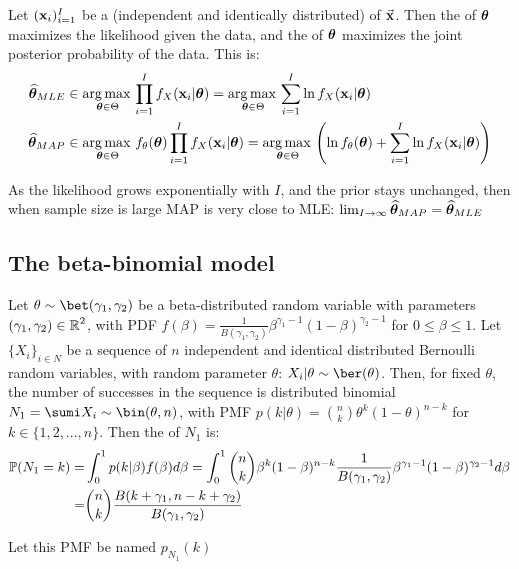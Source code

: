 Let $(\vb{x}_i)_{i=1}^I$ be a  (independent and identically distributed) of $\va{x}$. Then the  of $\vb*{\theta}$ maximizes the likelihood given the data, and the  of $\vb*{\theta}$ maximizes the joint posterior probability of the data. This is:
\begin{align*}
    \widehat{\vb*{\theta}}_{MLE} &\in\operatorname*{arg\,max\,}\limits_{\vb*{\theta}\in\Theta}\prod_{i=1}^I f_{X}(\vb{x}_i|\vb*{\theta}) = \operatorname*{arg\,max\,}\limits_{\vb*{\theta}\in\Theta}\sum_{i=1}^I\ln f_{X}(\vb{x}_i|\vb*{\theta})\\
    \widehat{\vb*{\theta}}_{MAP} &\in\operatorname*{arg\,max\,}\limits_{\vb*{\theta}\in\Theta}f_\theta(\vb*{\theta})
    \prod_{i=1}^I f_{X}(\vb{x}_i|\vb*{\theta}) = \operatorname*{arg\,max\,}\limits_{\vb*{\theta}\in\Theta}\left(\ln f_\theta(\vb*{\theta})+\sum_{i=1}^I\ln f_{X}(\vb{x}_i|\vb*{\theta})\right)
\end{align*}

As the likelihood grows exponentially with $I$, and the prior stays unchanged, then when sample size is large MAP is very close to MLE: $\lim_{I\rightarrow\infty}\widehat{\vb*{\theta}}_{MAP}=\widehat{\vb*{\theta}}_{MLE}$ \medskip























\subsection{The beta-binomial model}
Let  $\theta\sim\bet(\gamma_1,\gamma_2)$ be a beta-distributed random variable with parameters $(\gamma_1,\gamma_2)\in\operatorname{\mathbb{R}}^2$, with PDF $f(\beta)=\frac{1}{B(\gamma_1,\gamma_2)}\beta^{\gamma_1-1}(1-\beta)^{\gamma_2-1}$ for $0\leq\beta\leq 1$. Let $\{X_i\}_{i\in N}$ be a sequence of $n$ independent and identical distributed Bernoulli random variables, with random parameter $\theta$: $X_i|\theta\sim\ber(\theta)$. Then, for fixed $\theta$, the number of successes in the sequence is distributed binomial $N_1=\sumi X_i\sim \bin(\theta,n)$, with PMF $p(k|\theta)=\binom{n}{k}\theta^k(1-\theta)^{n-k}$ for $k\in\{1, 2,..., n\}$. Then the  of $N_1$ is: 
\begin{align*}
    \operatorname{\mathbb{P}}(N_1=k) =& \int_{0}^{1} p(k|\beta)f(\beta)d\beta=\int_{0}^{1}\binom{n}{k}\beta^k(1-\beta)^{n-k}\frac{1}{B(\gamma_1,\gamma_2)}\beta^{\gamma_1-1}(1-\beta)^{\gamma_2-1}d\beta\\
    =& \binom{n}{k}\frac{B(k+\gamma_1, n-k+\gamma_2)}{B(\gamma_1,\gamma_2)}
\end{align*}

Let this PMF be named $p_{N_1}(k)$

